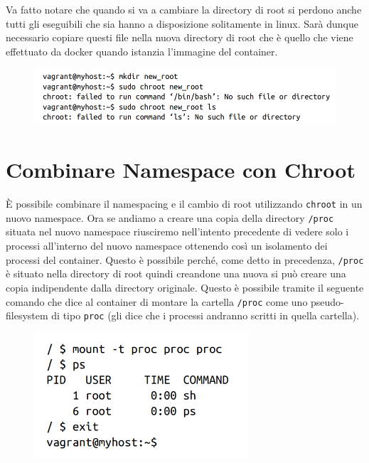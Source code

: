 Va fatto notare che quando si va a cambiare la directory di root si perdono anche
tutti gli eseguibili che sia hanno a disposizione solitamente in linux. Sarà
dunque necessario copiare questi file nella nuova directory di root che è
quello che viene effettuato da docker quando istanzia l'immagine del container.

\begin{figure}[H]
    \centering
    \includegraphics[width=\textwidth, keepaspectratio]{capitoli/os_security/imgs/root2.png}
\end{figure}

\section{Combinare Namespace con Chroot}

È possibile combinare il namespacing e il cambio di root utilizzando \verb|chroot|
in un nuovo namespace. Ora se andiamo a creare una copia della directory
\verb|/proc| situata nel nuovo namespace riusciremo nell'intento precedente
di vedere solo i processi all'interno del nuovo namespace ottenendo così un
isolamento dei processi del container. Questo è possibile perché, come detto
in precedenza, \verb|/proc| è situato nella directory di root quindi creandone una
nuova si può creare una copia indipendente dalla directory originale.
Questo è possibile tramite il seguente comando che dice al container di montare
la cartella \verb|/proc| come uno pseudo-filesystem di tipo \verb|proc|
(gli dice che i processi andranno scritti in quella cartella).

\begin{figure}[H]
    \centering
    \includegraphics[width=8cm, keepaspectratio]{capitoli/os_security/imgs/insieme1.png}
\end{figure}

